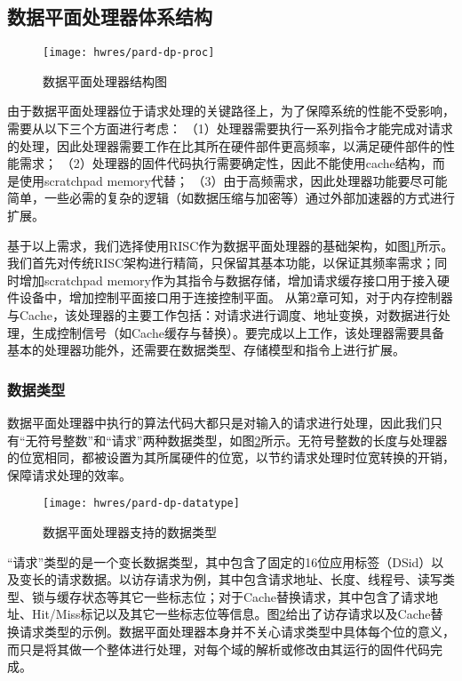 \subsection{数据平面处理器体系结构}

\begin{figure}[tb]
  \centering
  \texttt{[image: hwres/pard-dp-proc]}
  \caption{数据平面处理器结构图}
  \label{fig:pard-dp-proc}
\end{figure}

由于数据平面处理器位于请求处理的关键路径上，为了保障系统的性能不受影响，需要从以下三个方面进行考虑：
（1）处理器需要执行一系列指令才能完成对请求的处理，因此处理器需要工作在比其所在硬件部件更高频率，以满足硬件部件的性能需求；
（2）处理器的固件代码执行需要确定性，因此不能使用cache结构，而是使用scratchpad memory代替；
（3）由于高频需求，因此处理器功能要尽可能简单，一些必需的复杂的逻辑（如数据压缩与加密等）通过外部加速器的方式进行扩展。

基于以上需求，我们选择使用RISC作为数据平面处理器的基础架构，如图\ref{fig:pard-dp-proc}所示。我们首先对传统RISC架构进行精简，只保留其基本功能，以保证其频率需求；同时增加scratchpad memory作为其指令与数据存储，增加请求缓存接口用于接入硬件设备中，增加控制平面接口用于连接控制平面。
从第2章可知，对于内存控制器与Cache，该处理器的主要工作包括：对请求进行调度、地址变换，对数据进行处理，生成控制信号（如Cache缓存与替换）。要完成以上工作，该处理器需要具备基本的处理器功能外，还需要在数据类型、存储模型和指令上进行扩展。


\subsubsection{数据类型}

数据平面处理器中执行的算法代码大都只是对输入的请求进行处理，因此我们只有``无符号整数''和``请求''两种数据类型，如图\ref{fig:pard-dp-datatype}所示。无符号整数的长度与处理器的位宽相同，都被设置为其所属硬件的位宽，以节约请求处理时位宽转换的开销，保障请求处理的效率。

\begin{figure}[H]
  \centering
  \texttt{[image: hwres/pard-dp-datatype]}
  \caption{数据平面处理器支持的数据类型}
  \label{fig:pard-dp-datatype}
\end{figure}
 
``请求''类型的是一个变长数据类型，其中包含了固定的16位应用标签（DSid）以及变长的请求数据。以访存请求为例，其中包含请求地址、长度、线程号、读写类型、锁与缓存状态等其它一些标志位；对于Cache替换请求，其中包含了请求地址、Hit/Miss标记以及其它一些标志位等信息。图\ref{fig:pard-dp-datatype}给出了访存请求以及Cache替换请求类型的示例。数据平面处理器本身并不关心请求类型中具体每个位的意义，而只是将其做一个整体进行处理，对每个域的解析或修改由其运行的固件代码完成。

